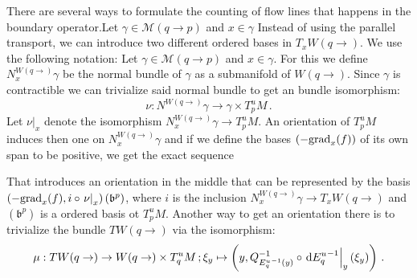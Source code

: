 \begin{remark}
There are several ways to formulate the counting of flow lines that happens in the boundary operator.Let $\gamma\in \mathcal{M}(q\to p)$ and $x\in \gamma$ Instead of using the parallel transport, we can introduce two different ordered bases in $T_{x}W(q\to)$. We use the following notation: 
Let $\gamma\in \mathcal{M}(q\to p)$ and $x\in \gamma$. For this we define $N_{x}^{W(q\to)}{\gamma}$ be the normal bundle of $\gamma$ as a submanifold of $W(q\to)$. Since $\gamma$ is contractible we can trivialize said normal bundle to get an bundle isomorphism: 
\begin{equation*}
	\nu:N^{W(q\to)}{\gamma} \to \gamma \times T^u_pM \, .
\end{equation*} Let $\nu\big|_{x}$ denote the isomorphism $N_{x}^{W(q\to)}{\gamma}\to  T^u_pM $. An orientation of $T^u_pM$ induces then one on $N_{x}^{W(q\to)}{\gamma}$ and if we define the bases $(-\mathrm{grad}_{x}(f))$ of its own span to be positive, we get the exact sequence
\begin{center}
\end{center} That introduces an orientation in the middle that can be represented by the basis $\left(-\mathrm{grad}_x(f),i\circ \left.\nu\right|_{x}\right)(\mathfrak{b}^p)$, where $i$ is the inclusion $N_{x}^{W(q\to)}{\gamma}\to T_xW(q\to)$  and $(\mathfrak{b}^p)$ is a ordered basis ot $T^u_pM$. 
Another way to get an orientation there is to trivialize the bundle $TW(q\to)$ via the isomorphism:
\begin{equation*}
	\mu: TW(q\to)\to W(q\to)\times T^u_qM\,; \xi_y\mapsto \left( y, Q_{{E^u_q}^{-1}(y)}^{-1}\circ \left.\mathop{}\!\mathrm{d} {E^u_q}^{-1}\right|_{y}(\xi_y)\right)\,.
\end{equation*}


\end{remark}
